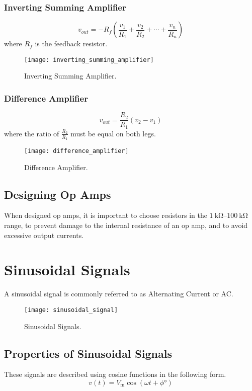 \documentclass{article}
\begin{document}
\subsubsection{Inverting Summing Amplifier}
\begin{equation*}
    v_{out} = -R_f \left( \frac{v_1}{R_1} + \frac{v_2}{R_2} + \cdots + \frac{v_n}{R_n} \right)
\end{equation*}
where $R_f$ is the feedback resistor.
\begin{figure}[H]
    \centering
    \texttt{[image: inverting\_summing\_amplifier]}
    \caption{Inverting Summing Amplifier.}
\end{figure}
\subsubsection{Difference Amplifier}
\begin{equation*}
    v_{out} = \frac{R_2}{R_1} \left( v_2 - v_1 \right)
\end{equation*}
where the ratio of $\displaystyle \frac{R_2}{R_1}$ must be equal on both legs.
\begin{figure}[H]
    \centering
    \texttt{[image: difference\_amplifier]}
    \caption{Difference Amplifier.}
\end{figure}
\subsection{Designing Op Amps}
When designed op amps, it is important to choose resistors in the $\qtyrange{1}{100}{\kilo\ohm}$
range, to prevent damage to the internal resistance of an op amp, and to avoid excessive output currents.
\newpage
\section{Sinusoidal Signals}
\begin{definition}
    A sinusoidal signal is commonly referred to as Alternating Current or AC.
\end{definition}
\begin{figure}[H]
    \centering
    \texttt{[image: sinusoidal\_signal]}
    \caption{Sinusoidal Signals.}
\end{figure}
\subsection{Properties of Sinusoidal Signals}
These signals are described using cosine functions in the following form.
\begin{equation*}
    v(t) = V_{\mathrm{m}} \cos{\left( \omega t + \phi\si{\degree} \right)}
\end{equation*}
\end{document}
